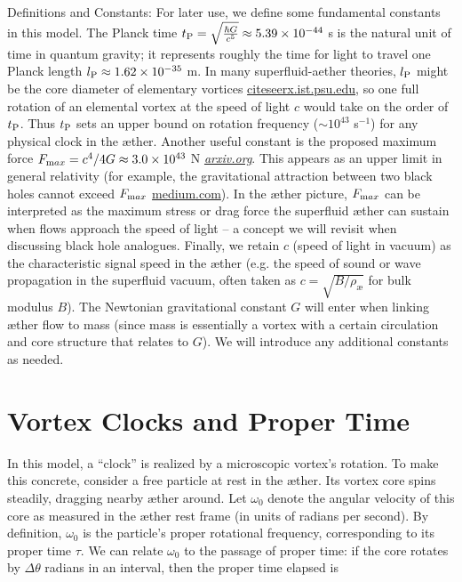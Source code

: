\documentclass[aps,preprint,superscriptaddress]{revtex4}
\begin{document}
    Definitions and Constants: For later use, we define some fundamental constants in this model. The Planck time $t_{\textrm P} = \sqrt{\frac{\hbar G}{c^5}} \approx 5.39\times10^{-44}$ s is the natural unit of time in quantum gravity; it represents roughly the time for light to travel one Planck length $l_{\textrm P}\approx1.62\times10^{-35}$ m. In many superfluid-aether theories, $l_{\textrm P}$ might be the core diameter of elementary vortices
    \href{https://citeseerx.ist.psu.edu/document?repid=rep1&type=pdf&doi=25483f1ebc9dc442a9f1505a49d96eb35e92e3f4#:~:text=45,on%20General%20Relativity%20and%20Relativistic}{citeseerx.ist.psu.edu}, so one full rotation of an elemental vortex at the speed of light $c$ would take on the order of $t_{\textrm P}$. Thus $t_{\textrm P}$ sets an upper bound on rotation frequency ($\sim10^{43}$ s$^{-1}$) for any physical clock in the æther. Another useful constant is the proposed maximum force $F_{\textrm max}=c^4/4G \approx 3.0\times10^{43}$ N
    \href{https://arxiv.org/abs/2205.06302#:~:text=the%20principle%20of%20maximum%20force,The%20limits%20illuminate}{\textit{arxiv.org}}. This appears as an upper limit in general relativity (for example, the gravitational attraction between two black holes cannot exceed $F_{\textrm max}$
    \href{https://medium.com/@motionmountain/4-there-is-a-maximum-force-in-nature-d87e1951e9a4#:~:text=,implies%20inverse%20square%20gravity}{medium.com}). In the æther picture, $F_{\textrm max}$ can be interpreted as the maximum stress or drag force the superfluid æther can sustain when flows approach the speed of light – a concept we will revisit when discussing black hole analogues. Finally, we retain $c$ (speed of light in vacuum) as the characteristic signal speed in the æther (e.g. the speed of sound or wave propagation in the superfluid vacuum, often taken as $c=\sqrt{B/\rho_{\text{\ae}}}$ for bulk modulus $B$). The Newtonian gravitational constant $G$ will enter when linking æther flow to mass (since mass is essentially a vortex with a certain circulation and core structure that relates to $G$). We will introduce any additional constants as needed.


\section*{Vortex Clocks and Proper Time}

In this model, a “clock” is realized by a microscopic vortex’s rotation. To make this concrete, consider a free particle at rest in the æther. Its vortex core spins steadily, dragging nearby æther around. Let $\omega_0$ denote the angular velocity of this core as measured in the æther rest frame (in units of radians per second). By definition, $\omega_0$ is the particle’s proper rotational frequency, corresponding to its proper time $\tau$. We can relate $\omega_0$ to the passage of proper time: if the core rotates by $\Delta \theta$ radians in an interval, then the proper time elapsed is
\end{document}
